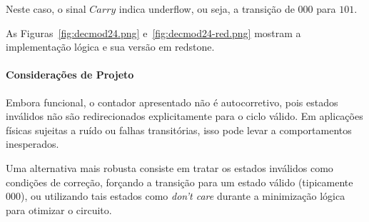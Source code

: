 Neste caso, o sinal $Carry$ indica underflow, ou seja, a transição de $000$ para $101$.

As Figuras~\ref{fig:decmod24.png} e~\ref{fig:decmod24-red.png} mostram a implementação lógica e sua versão em redstone.


\paragraph{Considerações de Projeto}

Embora funcional, o contador apresentado não é autocorretivo, pois estados inválidos não são redirecionados explicitamente para o ciclo válido. Em aplicações físicas sujeitas a ruído ou falhas transitórias, isso pode levar a comportamentos inesperados.

Uma alternativa mais robusta consiste em tratar os estados inválidos como condições de correção, forçando a transição para um estado válido (tipicamente $000$), ou utilizando tais estados como \textit{don't care} durante a minimização lógica para otimizar o circuito.

